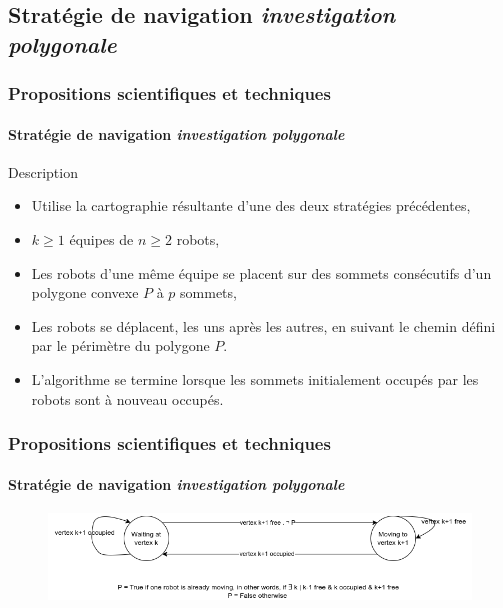 \documentclass{beamer}
\begin{document}
		\subsection{Stratégie de navigation \textit{investigation polygonale}}
			\begin{frame}
				\frametitle{Propositions scientifiques et techniques}
				\framesubtitle{Stratégie de navigation \textit{investigation polygonale}}
				\begin{block}{Description}
					\begin{itemize}
						\item Utilise la cartographie résultante d'une des deux stratégies précédentes,
						\item $k \ge 1$ équipes de $n \ge 2$ robots,
						\item Les robots d'une même équipe se placent sur des sommets consécutifs d'un polygone convexe $P$ à $p$ sommets,
						\item Les robots se déplacent, les uns après les autres, en suivant le chemin défini par le périmètre du polygone $P$.
						\item L'algorithme se termine lorsque les sommets initialement occupés par les robots sont à nouveau occupés.
					\end{itemize}
				\end{block}
			\end{frame}
			\begin{frame}
				\frametitle{Propositions scientifiques et techniques}
				\framesubtitle{Stratégie de navigation \textit{investigation polygonale}}
				\begin{figure}
					\centering
					\includegraphics[width=1.0\textwidth]{graphics/automat_poly.png}
				\end{figure}
			\end{frame}
\end{document}
